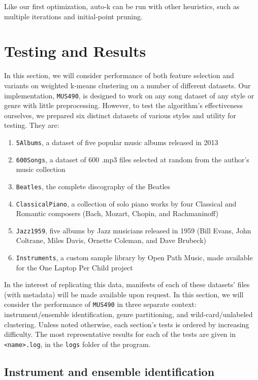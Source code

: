 \documentclass[12pt,twocolumn,titlepage]{article}
\begin{document}
Like our first optimization, auto-k can be run with other heuristics, such as multiple iterations and initial-point pruning. 


\section{Testing and Results}
\label{sec:testing}


In this section, we will consider performance of both feature selection and variants on weighted k-means clustering on a number of different datasets. Our implementation, \texttt{MUS490}, is designed to work on any song dataset of any style or genre with little preprocessing. However, to test the algorithm's effectiveness ourselves, we prepared six distinct datasets of various styles and utility for testing. They are:
\begin{enumerate}[itemsep=0mm]
\item{\texttt{5Albums}, a dataset of five popular music albums released in 2013}
\item{\texttt{600Songs}, a dataset of 600 .mp3 files selected at random from the author's music collection}
\item{\texttt{Beatles}, the complete discography of the Beatles}
\item{\texttt{ClassicalPiano}, a collection of solo piano works by four Classical and Romantic composers (Bach, Mozart, Chopin, and Rachmaninoff)}
\item{\texttt{Jazz1959}, five albums by Jazz musicians released in 1959 (Bill Evans, John Coltrane, Miles Davis, Ornette Coleman, and Dave Brubeck)}
\item{\texttt{Instruments}, a custom sample library by Open Path Music, made available for the One Laptop Per Child project} \cite{OpenPathMusic}
\end{enumerate}

In the interest of replicating this data, manifests of each of these datasets' files (with metadata) will be made available upon request. In this section, we will consider the performance of \texttt{MUS490} in three separate context: instrument/ensemble identification, genre partitioning, and wild-card/unlabeled clustering. Unless noted otherwise, each section's tests is ordered by increasing difficulty. The most representative results for each of the tests are given in \texttt{<name>.log}, in the \texttt{logs} folder of the program.

\subsection{Instrument and ensemble identification}
\end{document}
